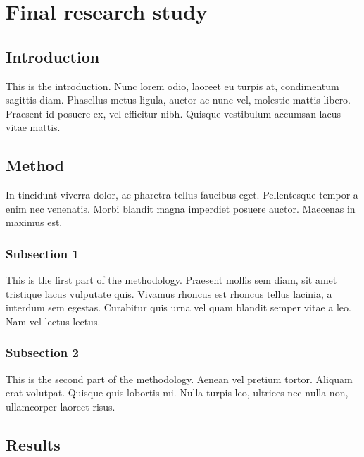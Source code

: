 \documentclass[12pt,a4paper,]{report}
\begin{document}
\hypertarget{final-research-study}{%
\chapter{Final research study}\label{final-research-study}}

\hypertarget{introduction-4}{%
\section{Introduction}\label{introduction-4}}

This is the introduction. Nunc lorem odio, laoreet eu turpis at,
condimentum sagittis diam. Phasellus metus ligula, auctor ac nunc vel,
molestie mattis libero. Praesent id posuere ex, vel efficitur nibh.
Quisque vestibulum accumsan lacus vitae mattis.

\hypertarget{method-3}{%
\section{Method}\label{method-3}}

In tincidunt viverra dolor, ac pharetra tellus faucibus eget.
Pellentesque tempor a enim nec venenatis. Morbi blandit magna imperdiet
posuere auctor. Maecenas in maximus est.

\hypertarget{subsection-1-2}{%
\subsection{Subsection 1}\label{subsection-1-2}}

This is the first part of the methodology. Praesent mollis sem diam, sit
amet tristique lacus vulputate quis. Vivamus rhoncus est rhoncus tellus
lacinia, a interdum sem egestas. Curabitur quis urna vel quam blandit
semper vitae a leo. Nam vel lectus lectus.

\hypertarget{subsection-2-3}{%
\subsection{Subsection 2}\label{subsection-2-3}}

This is the second part of the methodology. Aenean vel pretium tortor.
Aliquam erat volutpat. Quisque quis lobortis mi. Nulla turpis leo,
ultrices nec nulla non, ullamcorper laoreet risus.

\hypertarget{results-3}{%
\section{Results}\label{results-3}}
\end{document}
